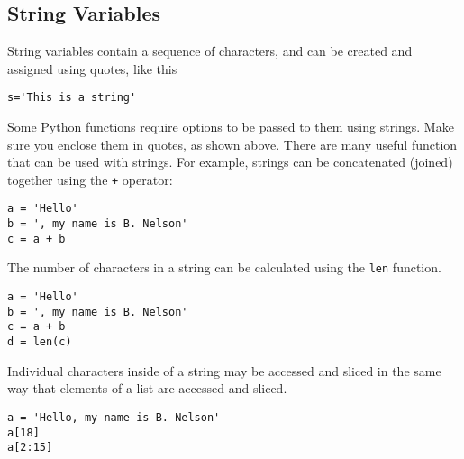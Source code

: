 \subsection*{String Variables}
 String variables contain a sequence of characters, and
can be created and assigned using quotes, like this
\begin{Verbatim}
s='This is a string'
\end{Verbatim}
Some Python functions require options to be passed to them using
strings. Make sure you enclose them in quotes, as shown
above.  There are many useful function that can be used with strings.
For example, strings can be concatenated (joined) together using the
\texttt{+} operator:
\begin{Verbatim}
a = 'Hello'
b = ', my name is B. Nelson'
c = a + b
\end{Verbatim}
The number of characters in a string can be calculated using the
\texttt{len} function.
\begin{Verbatim}
a = 'Hello'
b = ', my name is B. Nelson'
c = a + b
d = len(c)
\end{Verbatim}
Individual characters inside of a string may be accessed  and sliced
in the same way that elements of a list are accessed and sliced.
\begin{Verbatim}
a = 'Hello, my name is B. Nelson'
a[18]
a[2:15]
\end{Verbatim}
